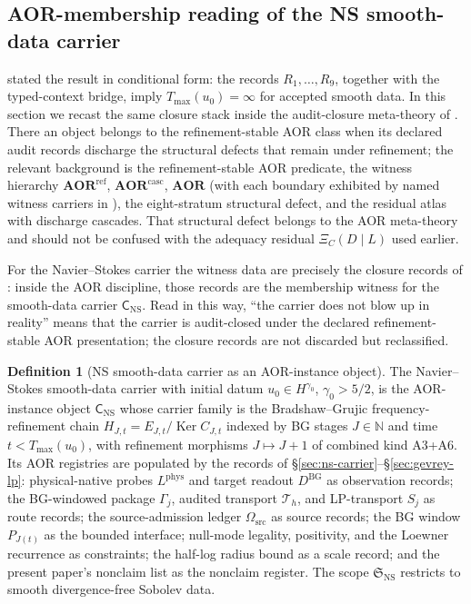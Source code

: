 \documentclass[11pt]{article}
\DeclareMathOperator{\Ker}{Ker}
\newcommand{\DBG}{D^{\mathrm{BG}}}
\newcommand{\Lphys}{L^{\mathrm{phys}}}
\newcommand{\Tmax}{T_{\max}}
\newcommand{\Omsrc}{\Omega_{\mathrm{src}}}
\theoremstyle{definition}
\newtheorem{definition}[theorem]{Definition}
\begin{document}
\subsection{AOR-membership reading of the NS smooth-data carrier}

 stated the result in
conditional form: the records \(R_1,\ldots,R_9\), together with the
typed-context bridge, imply \(\Tmax(u_0)=\infty\) for accepted smooth
data.  In this section we recast the same closure stack inside the
audit-closure meta-theory of \citet{Tsiokos2026AOR}.  There an object
belongs to the refinement-stable AOR class when its declared audit
records discharge the structural defects that remain under refinement;
the relevant background is the refinement-stable AOR predicate, the
witness hierarchy \(\mathbf{AOR}^{\mathrm{ref}}\),
\(\mathbf{AOR}^{\mathrm{casc}}\), \(\mathbf{AOR}\) (with each
boundary exhibited by named witness carriers in
\citet{Tsiokos2026AOR}), the eight-stratum structural defect, and
the residual atlas with discharge cascades.  That structural defect
belongs to the AOR
meta-theory and should not be confused with the adequacy residual
\(\Xi_C(D\mid L)\) used earlier.

For the Navier--Stokes carrier the witness data are precisely the
closure records of : inside the AOR
discipline, those records are the membership witness for the
smooth-data carrier \(\mathsf C_{\mathrm{NS}}\).  Read in this way,
``the carrier does not blow up in reality'' means that the carrier is
audit-closed under the declared refinement-stable AOR presentation;
the closure records are not discarded but reclassified.

\begin{definition}[NS smooth-data carrier as an AOR-instance object]\label{def:ns:aor-instance-object}
The Navier--Stokes smooth-data carrier with initial datum $u_0\in H^{\gamma_0}$, $\gamma_0>5/2$, is the AOR-instance object $\mathsf C_{\mathrm{NS}}$ whose carrier family is the Bradshaw--Grujic frequency-refinement chain $H_{J,t}=E_{J,t}/\Ker C_{J,t}$ indexed by BG stages $J\in\mathbb N$ and time $t<\Tmax(u_0)$, with refinement morphisms $J\mapsto J+1$ of combined kind A3+A6.  Its AOR registries are populated by the records of \S\ref{sec:ns-carrier}--\S\ref{sec:gevrey-lp}: physical-native probes $\Lphys$ and target readout $\DBG$ as observation records; the BG-windowed package $\Gamma_j$, audited transport $\mathcal T_h$, and LP-transport $S_j$ as route records; the source-admission ledger $\Omsrc$ as source records; the BG window $P_{J(t)}$ as the bounded interface; null-mode legality, positivity, and the Loewner recurrence as constraints; the half-log radius bound as a scale record; and the present paper's nonclaim list as the nonclaim register.  The scope $\mathfrak S_{\mathrm{NS}}$ restricts to smooth divergence-free Sobolev data.
\end{definition}
\end{document}
